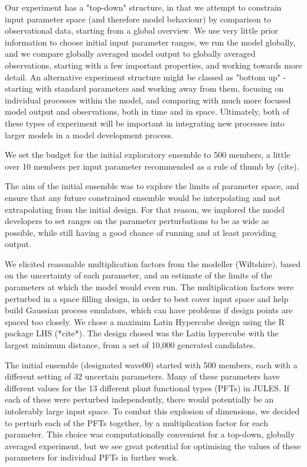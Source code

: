 \documentclass[gmd, manuscript]{copernicus}
\begin{document}
Our experiment has a "top-down" structure, in that we attempt to constrain input parameter space (and therefore model behaviour) by comparison to observational data, starting from a global overview. We use very little prior information to choose initial input parameter ranges, we run the model globally, and we compare globally averaged model output to globally averaged observations, starting with a few important properties, and working towards more detail. An alternative experiment structure might be classed as "bottom up" - starting with standard parameters and working away from them, focusing on individual processes within the model, and comparing with much more focused model output and observations, both in time and in space. Ultimately, both of these types of experiment will be important in integrating new processes into larger models in a model development process.

We set the budget for the initial exploratory ensemble to 500 members, a little over 10 members per input parameter recommended as a rule of thumb by (cite). 

The aim of the initial ensemble was to explore the limits of parameter space, and ensure that any future constrained ensemble would be interpolating and not extrapolating from the initial design. For that reason, we implored the model developers to set ranges on the parameter perturbations to be as wide as possible, while still having a good chance of running and at least providing output.

We elicited reasonable multiplication factors from the modeller (Wiltshire), based on the uncertainty of each parameter, and an estimate of the limits of the parameters at which the model would even run. The multiplication factors were perturbed in a space filling design, in order to best cover input space and help build Gaussian process emulators, which can have problems if design points are spaced too closely. We chose a maximim Latin Hypercube design using the R package LHS (*cite*). The design chosed was the Latin hypercube with the largest minimum distance, from a set of 10,000 generated candidates.

The initial ensemble (designated wave00) started with 500 members, each with a different setting of 32 uncertain parameters. Many of these parameters have different values for the 13 different plant functional types (PFTs) in JULES. If each of these were perturbed independently, there would potentially be an intolerably large input space. To combat this explosion of dimensions, we decided to perturb each of the PFTs together, by a multiplication factor for each parameter. This choice was computationally convenient for a top-down, globally averaged experiment, but we see great potential for optimising the values of these parameters for individual PFTs in further work. 
\end{document}
